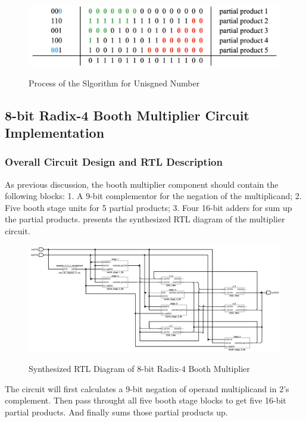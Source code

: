 \begin{figure}[!ht]
	\centering
	\caption{Process of the Slgorithm for Unisgned Number}
	\includegraphics[width=5.7in]{../img/r4b_process_2.png}
	\label{fig:r4b_process_2}
\end{figure}

\subsection{8-bit Radix-4 Booth Multiplier Circuit Implementation}
\subsubsection{Overall Circuit Design and RTL Description}

As previous discussion, the booth multiplier component should contain the following blocks: 1.
A 9-bit complementor for the negation of the multiplicand;
2. Five booth stage units for 5 partial products;
3. Four 16-bit adders for sum up the partial products.
 presents the synthesized RTL diagram of the multiplier circuit.

\begin{figure}[!ht]
	\centering
	\caption{Synthesized RTL Diagram of 8-bit Radix-4 Booth Multiplier}
	\includegraphics[width=\textwidth]{../img/overview_booth_rtl.png}
	\label{fig:overview_booth_rtl}
\end{figure}

The circuit will first calculates a 9-bit negation of operand multiplicand in 2's complement.
Then pass throught all five booth stage blocks to get five 16-bit partial products. And finally sums those partial products up.

